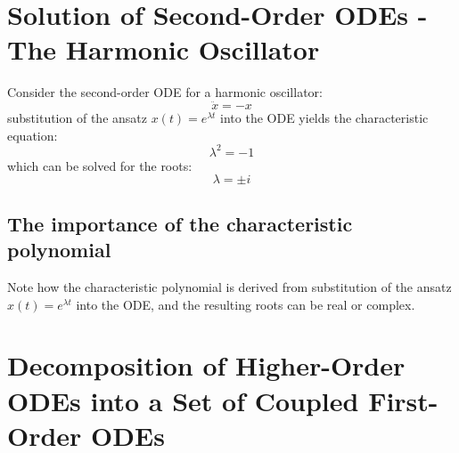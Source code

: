 \documentclass[a4paper,11pt,landscape]{article}
\begin{document}
\section{Solution of Second-Order ODEs - The Harmonic Oscillator}

Consider the second-order ODE for a harmonic oscillator:
\begin{equation} \label{eqn:exp_growth} 
    \ddot{x} = -x
\end{equation}
substitution of the ansatz $x(t)=e^{\lambda t}$ into the ODE yields the characteristic equation:
\begin{equation} \label{eqn:exp_growth} 
    \lambda^2 = -1
\end{equation}
which can be solved for the roots:
\begin{equation} \label{eqn:exp_growth} 
    \lambda = \pm i
\end{equation}




\subsection{The importance of the characteristic polynomial}

Note how the characteristic polynomial is derived from substitution of the ansatz $x(t)=e^{\lambda t}$ into the ODE, and the resulting roots can be real or complex.

\section{Decomposition of Higher-Order ODEs into a Set of Coupled First-Order ODEs}
\end{document}
